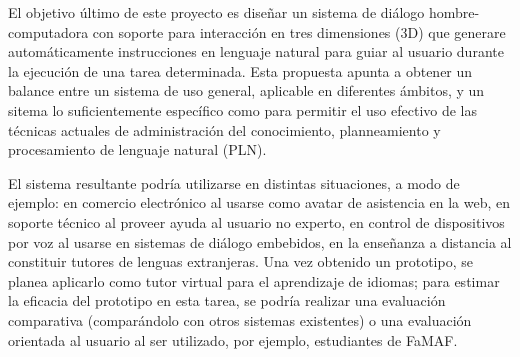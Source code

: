 
El objetivo \'ultimo de este proyecto es dise\~nar un sistema de di\'alogo hombre-computadora con soporte para interacci\'on en tres dimensiones (3D) que generare autom\'aticamente instrucciones en lenguaje natural para guiar  al usuario durante la ejecuci\'on de una tarea determinada. Esta propuesta apunta
a obtener un balance entre un sistema de uso general, aplicable en
diferentes \'ambitos, y un sitema lo suficientemente espec\'ifico
como para permitir el uso efectivo de las t\'ecnicas actuales de
administraci\'on del conocimiento, planneamiento y procesamiento de lenguaje natural (PLN).

El sistema resultante podr\'ia utilizarse en distintas situaciones, a modo de ejemplo:
en comercio electr\'onico  al usarse como avatar de asistencia en la web, en soporte t\'ecnico al proveer ayuda al usuario no experto, en
control de dispositivos por voz al usarse en sistemas de di\'alogo embebidos,
en la ense\~nanza a distancia al constituir tutores de lenguas extranjeras.  Una vez obtenido
un prototipo, se planea aplicarlo  como
tutor virtual para el aprendizaje de idiomas; para estimar la eficacia del prototipo  en esta tarea, se podr\'ia realizar una evaluaci\'on comparativa (compar\'andolo con otros sistemas existentes) o una evaluaci\'on orientada al usuario al ser utilizado, por ejemplo, estudiantes de FaMAF.


